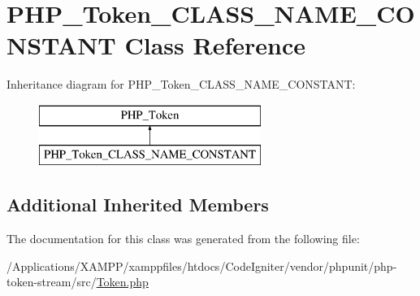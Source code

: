 \hypertarget{class_p_h_p___token___c_l_a_s_s___n_a_m_e___c_o_n_s_t_a_n_t}{}\section{P\+H\+P\+\_\+\+Token\+\_\+\+C\+L\+A\+S\+S\+\_\+\+N\+A\+M\+E\+\_\+\+C\+O\+N\+S\+T\+A\+NT Class Reference}
\label{class_p_h_p___token___c_l_a_s_s___n_a_m_e___c_o_n_s_t_a_n_t}
Inheritance diagram for P\+H\+P\+\_\+\+Token\+\_\+\+C\+L\+A\+S\+S\+\_\+\+N\+A\+M\+E\+\_\+\+C\+O\+N\+S\+T\+A\+NT\+:\begin{figure}[H]
\begin{center}
\leavevmode
\includegraphics[height=2.000000cm]{class_p_h_p___token___c_l_a_s_s___n_a_m_e___c_o_n_s_t_a_n_t}
\end{center}
\end{figure}
\subsection*{Additional Inherited Members}


The documentation for this class was generated from the following file\+:\begin{DoxyCompactItemize}
\item 
/\+Applications/\+X\+A\+M\+P\+P/xamppfiles/htdocs/\+Code\+Igniter/vendor/phpunit/php-\/token-\/stream/src/\mbox{\hyperlink{_token_8php}{Token.\+php}}\end{DoxyCompactItemize}
